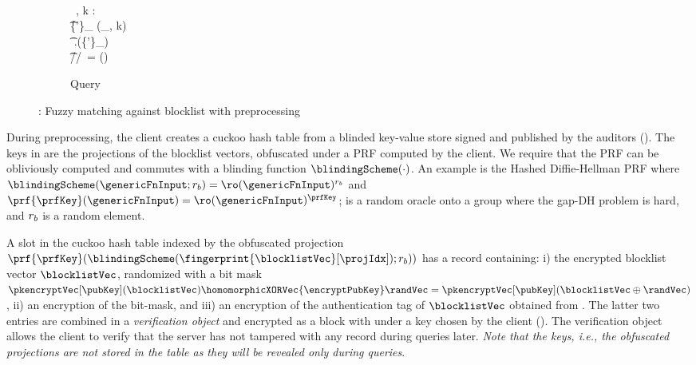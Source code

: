 \begin{figure}
{{\begin{subfigure}[t]{0.5\textwidth}
{\hspace{2cm} \\
\hspace{3cm}  ~\projIdx \in \nats[\numProjections], k \in \nats[2]:\\
\hspace{3cm} \t \pcln \{\secretShare{\projIdx}'\}_{\projIdx \in \nats[\genericVecLen]} \assign \decryptVec[\encryptPrivKey](\vec{\ciphertext}_{\projIdx, k}) \\ 
\hspace{3cm} \t \pcln \tilde{\fileKey} \assign \secretShare.\SSCombine(\{\secretShare{\projIdx}'\}_{\projIdx \in \nats[\genericVecLen]})\\
\hspace{3cm} \t \pcln /\!/~\clientData = \decrypt[\tilde{\fileKey}](\cOutputFile) ~ ~\clientVec \in \blocklist
}
\caption{Query\label{fig:fuzzy_match_query}}
\end{subfigure}
\vspace{-5pt}
\caption{\small \protocolFMP: Fuzzy matching against blocklist with preprocessing\label{fig:fuzzy_match_full}}
}}
\end{figure}

During preprocessing, the client creates a cuckoo hash table \cuckooTable from a blinded key-value store \kvs signed and published by the auditors (). The keys in \cuckooTable are the projections of the blocklist vectors, obfuscated under a PRF computed by the client. We require that the PRF can be obliviously computed and commutes with a blinding function $\blindingScheme(\cdot)$. An example is the Hashed Diffie-Hellman PRF where $\blindingScheme(\genericFnInput; \blindingRand) = \ro(\genericFnInput)^{\blindingRand}$ and $\prf{\prfKey}(\genericFnInput) = \ro(\genericFnInput)^{\prfKey}$; \ro is a random oracle onto a group where the gap-DH problem is hard, and $r_{b}$ is a random element. 

A slot in the cuckoo hash table indexed by the obfuscated projection $\prf{\prfKey}(\blindingScheme(\fingerprint{\blocklistVec}[\projIdx]); \blindingRand))$ has a record containing: i) the encrypted blocklist vector $\blocklistVec$, randomized with a bit mask $\pkencryptVec[\pubKey](\blocklistVec) \homomorphicXORVec{\encryptPubKey} \randVec = \pkencryptVec[\pubKey](\blocklistVec \oplus \randVec)$, ii) an encryption of the bit-mask, and iii) an encryption of the authentication tag of $\blocklistVec$ obtained from \evaFunc.  
The latter two entries are combined in a \emph{verification object} and encrypted as a block with \encryptionSchemeDefn under a key chosen by the client (). The verification object allows the client to verify that the server has not tampered with any record during queries later. \emph{Note that the keys, i.e., the obfuscated projections are not stored in the table as they will be revealed only during queries}. 	


